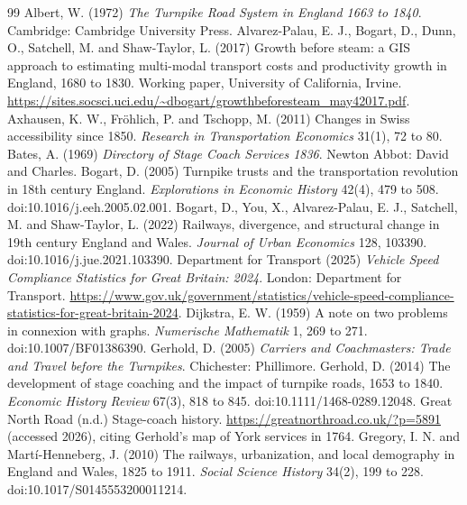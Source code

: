 \begin{thebibliography}{99}
 Albert, W. (1972) \textit{The Turnpike Road System in England 1663 to 1840}. Cambridge: Cambridge University Press.
 Alvarez-Palau, E. J., Bogart, D., Dunn, O., Satchell, M. and Shaw-Taylor, L. (2017) Growth before steam: a GIS approach to estimating multi-modal transport costs and productivity growth in England, 1680 to 1830. Working paper, University of California, Irvine. \url{https://sites.socsci.uci.edu/~dbogart/growthbeforesteam_may42017.pdf}.
 Axhausen, K. W., Fr\"ohlich, P. and Tschopp, M. (2011) Changes in Swiss accessibility since 1850. \textit{Research in Transportation Economics} 31(1), 72 to 80.
 Bates, A. (1969) \textit{Directory of Stage Coach Services 1836}. Newton Abbot: David and Charles.
 Bogart, D. (2005) Turnpike trusts and the transportation revolution in 18th century England. \textit{Explorations in Economic History} 42(4), 479 to 508. doi:10.1016/j.eeh.2005.02.001.
 Bogart, D., You, X., Alvarez-Palau, E. J., Satchell, M. and Shaw-Taylor, L. (2022) Railways, divergence, and structural change in 19th century England and Wales. \textit{Journal of Urban Economics} 128, 103390. doi:10.1016/j.jue.2021.103390.
 Department for Transport (2025) \textit{Vehicle Speed Compliance Statistics for Great Britain: 2024}. London: Department for Transport. \url{https://www.gov.uk/government/statistics/vehicle-speed-compliance-statistics-for-great-britain-2024}.
 Dijkstra, E. W. (1959) A note on two problems in connexion with graphs. \textit{Numerische Mathematik} 1, 269 to 271. doi:10.1007/BF01386390.
 Gerhold, D. (2005) \textit{Carriers and Coachmasters: Trade and Travel before the Turnpikes}. Chichester: Phillimore.
 Gerhold, D. (2014) The development of stage coaching and the impact of turnpike roads, 1653 to 1840. \textit{Economic History Review} 67(3), 818 to 845. doi:10.1111/1468-0289.12048.
 Great North Road (n.d.) Stage-coach history. \url{https://greatnorthroad.co.uk/?p=5891} (accessed 2026), citing Gerhold's map of York services in 1764.
 Gregory, I. N. and Mart\'i-Henneberg, J. (2010) The railways, urbanization, and local demography in England and Wales, 1825 to 1911. \textit{Social Science History} 34(2), 199 to 228. doi:10.1017/S0145553200011214.

\end{thebibliography}
